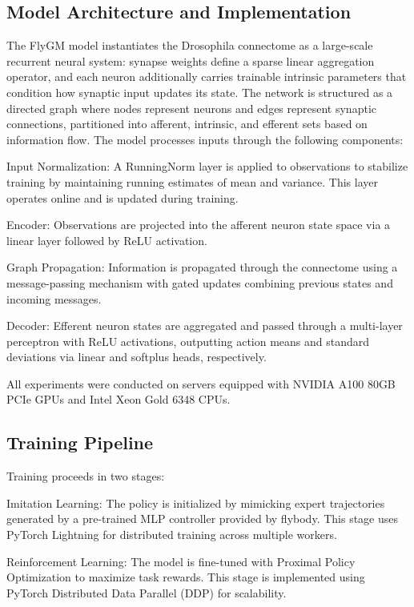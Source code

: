\documentclass{article}
\theoremstyle{plain}
\theoremstyle{definition}
\theoremstyle{remark}
\begin{document}
\subsection{Model Architecture and Implementation}

The FlyGM model instantiates the Drosophila connectome as a large-scale recurrent neural system: synapse weights define a sparse linear aggregation operator, and each neuron additionally carries trainable intrinsic parameters that condition how synaptic input updates its state. The network is structured as a directed graph where nodes represent neurons and edges represent synaptic connections, partitioned into afferent, intrinsic, and efferent sets based on information flow. The model processes inputs through the following components:

Input Normalization: A RunningNorm layer is applied to observations to stabilize training by maintaining running estimates of mean and variance. This layer operates online and is updated during training.  

Encoder: Observations are projected into the afferent neuron state space via a linear layer followed by ReLU activation.  

Graph Propagation: Information is propagated through the connectome using a message-passing mechanism with gated updates combining previous states and incoming messages.  

Decoder: Efferent neuron states are aggregated and passed through a multi-layer perceptron with ReLU activations, outputting action means and standard deviations via linear and softplus heads, respectively.  

All experiments were conducted on servers equipped with NVIDIA A100 80GB PCIe GPUs and Intel Xeon Gold 6348 CPUs.

\subsection{Training Pipeline}

Training proceeds in two stages:  

Imitation Learning: The policy is initialized by mimicking expert trajectories generated by a pre-trained MLP controller provided by flybody. This stage uses PyTorch Lightning for distributed training across multiple workers.  

Reinforcement Learning: The model is fine-tuned with Proximal Policy Optimization to maximize task rewards. This stage is implemented using PyTorch Distributed Data Parallel (DDP) for scalability.  
\end{document}
